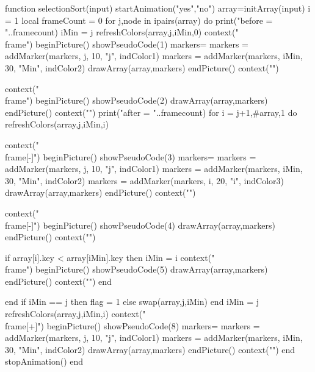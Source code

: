 function selectionSort(input)
	startAnimation("yes","no")
	array=initArray(input)
	i = 1
	local frameCount = 0
	for j,node in ipairs(array) do
		print("before = "..framecount)
		iMin = j
		refreshColors(array,j,iMin,0)
		context("\\frame{")
		beginPicture()
		showPseudoCode(1)
		markers={}
		markers = addMarker(markers, j, 10, "j", indColor1)
		markers = addMarker(markers, iMin, 30, "Min", indColor2)
		drawArray(array,markers)
		endPicture()
		context("}")

		context("\\frame{")
		beginPicture()
		showPseudoCode(2)
		drawArray(array,markers)
		endPicture()
		context("}")
		print("after = "..framecount)
		for i = j+1,#array,1 do
			refreshColors(array,j,iMin,i)

			context("\\frame[-]{")
			beginPicture()
			showPseudoCode(3)
			markers={}
			markers = addMarker(markers, j, 10, "j", indColor1)
			markers = addMarker(markers, iMin, 30, "Min", indColor2)
			markers = addMarker(markers, i, 20, "i", indColor3)
			drawArray(array,markers)
			endPicture()
			context("}")

			context("\\frame[-]{")
			beginPicture()
			showPseudoCode(4)
			drawArray(array,markers)
			endPicture()
			context("}")

			if array[i].key < array[iMin].key then
				iMin = i
				context("\\frame{")
				beginPicture()
				showPseudoCode(5)
				drawArray(array,markers)
				endPicture()
				context("}")
			end

		end
		if iMin == j  then
			flag = 1
		else
			swap(array,j,iMin)
		end
		iMin = j
		refreshColors(array,j,iMin,i)
		context("\\frame[+]{")
		beginPicture()
		showPseudoCode(8)
		markers={}
		markers = addMarker(markers, j, 10, "j", indColor1)
		markers = addMarker(markers, iMin, 30, "Min", indColor2)
		drawArray(array,markers)
		endPicture()
		context("}")
	end
	stopAnimation()
end
\stopluacode

